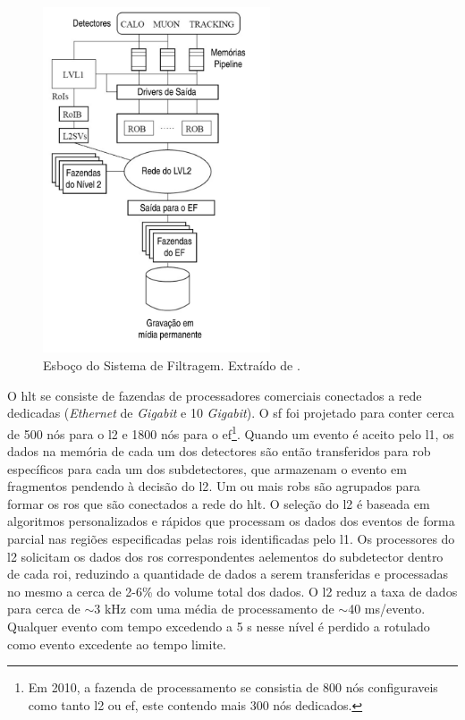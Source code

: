\begin{figure}[ht!]
\label{fig:sf_esboco}
\centering
\includegraphics[width=0.6\textwidth]{imagens/sf_resumo.pdf}
\caption[Esboço do Sistema de Filtragem.]{Esboço do Sistema de Filtragem. Extraído de \cite{tese_eduardo}.}
\end{figure}

O \gls{hlt} se consiste de fazendas de
processadores comerciais conectados a rede dedicadas (\emph{Ethernet} de \emph{Gigabit} 
e 10 \emph{Gigabit}).  O \gls{sf} foi projetado para conter cerca de 500 nós para o
\acrshort{l2} e 1800 nós para o \acrshort{ef}\footnote{Em 2010, a fazenda de processamento 
se consistia de 800 nós configuraveis como tanto \acrshort{l2} ou \acrshort{ef}, este 
contendo mais 300 nós dedicados.}. Quando um evento é aceito pelo
\gls{l1}, os dados na memória de cada um dos detectores são então transferidos
para \gls{rob} específicos para cada um dos subdetectores, que armazenam o
evento em fragmentos pendendo à decisão do \gls{l2}. Um ou mais \glspl{rob} são
agrupados para formar os \gls{ros} que são conectados a rede do \gls{hlt}. O
seleção do \gls{l2} é baseada em algoritmos personalizados e rápidos que
processam os dados dos eventos de forma parcial nas regiões especificadas pelas
\glspl{roi} identificadas pelo \gls{l1}. Os processores do \gls{l2} solicitam os
dados dos \gls{ros} correspondentes aelementos do subdetector dentro de cada
\gls{roi}, reduzindo a quantidade de dados a serem transferidas e processadas no
mesmo a cerca de 2-6\% do volume total dos dados. O \gls{l2} reduz a taxa de
dados para cerca de $\sim$3 kHz com uma média de processamento de $\sim$40
ms/evento. Qualquer evento com tempo excedendo a 5 s nesse nível é perdido a
rotulado como evento excedente ao tempo limite.   

